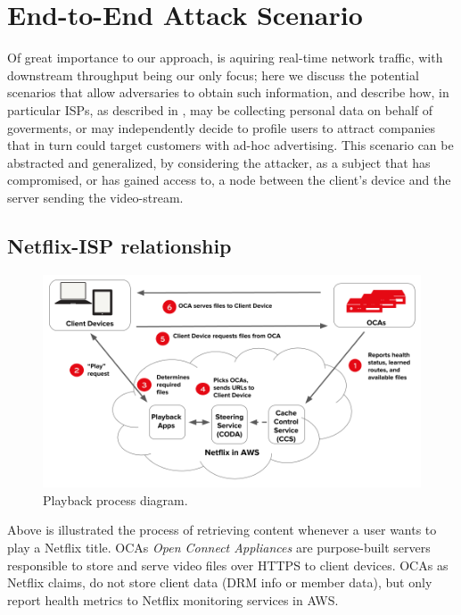\chapter{End-to-End Attack Scenario}\label{sec:attack_isp}

Of great importance to our approach, is aquiring real-time network traffic,
with downstream throughput being our only focus; here we discuss the potential
scenarios that allow adversaries to obtain such information, and describe how,
in particular ISPs, as described in , may be collecting
personal data on behalf of goverments, or may independently decide to profile
users to attract companies that in turn could target customers with ad-hoc
advertising. This scenario can be abstracted and generalized, by considering
the attacker, as a subject that has compromised, or has gained access to, a
node between the client's device and the server sending the video-stream.

\section{Netflix-ISP relationship}

\begin{figure}[!htb]
  \centering
  \includegraphics[width=\columnwidth]{img/playback.png}
  \caption{Playback process diagram. \cite{netflix_oca}}
  \label{fig:playback}
\end{figure}

Above is illustrated the process of retrieving content whenever a user wants to
play a Netflix title. OCAs \emph{Open Connect Appliances} are purpose-built
servers responsible to store and serve video files over HTTPS to client
devices.  OCAs as Netflix claims, do not store client data (DRM info or member
data), but only report health metrics to Netflix monitoring services in AWS.

